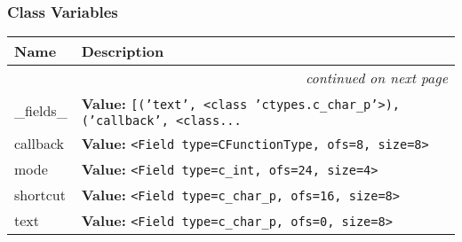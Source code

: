 
  \subsubsection{Class Variables}

    \vspace{-1cm}
\hspace{\varindent}\begin{longtable}{|p{\varnamewidth}|p{\vardescrwidth}|l}
\cline{1-2}
\cline{1-2} \centering \textbf{Name} & \centering \textbf{Description}& \\
\cline{1-2}
\endhead\cline{1-2}\multicolumn{3}{r}{\small\textit{continued on next page}}\\\endfoot\cline{1-2}
\endlastfoot\raggedright \_\-f\-i\-e\-l\-d\-s\-\_\- & \raggedright \textbf{Value:} 
{\tt \texttt{[}\texttt{(}\texttt{'}\texttt{text}\texttt{'}\texttt{, }{\textless}class 'ctypes.c\_char\_p'{\textgreater}\texttt{)}\texttt{, }\texttt{(}\texttt{'}\texttt{callback}\texttt{'}\texttt{, }{\textless}class\texttt{...}}&\\
\cline{1-2}
\raggedright c\-a\-l\-l\-b\-a\-c\-k\- & \raggedright \textbf{Value:} 
{\tt {\textless}Field type=CFunctionType, ofs=8, size=8{\textgreater}}&\\
\cline{1-2}
\raggedright m\-o\-d\-e\- & \raggedright \textbf{Value:} 
{\tt {\textless}Field type=c\_int, ofs=24, size=4{\textgreater}}&\\
\cline{1-2}
\raggedright s\-h\-o\-r\-t\-c\-u\-t\- & \raggedright \textbf{Value:} 
{\tt {\textless}Field type=c\_char\_p, ofs=16, size=8{\textgreater}}&\\
\cline{1-2}
\raggedright t\-e\-x\-t\- & \raggedright \textbf{Value:} 
{\tt {\textless}Field type=c\_char\_p, ofs=0, size=8{\textgreater}}&\\
\cline{1-2}
\end{longtable}



